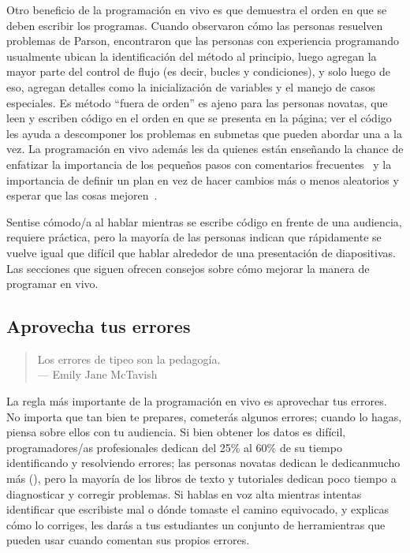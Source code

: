 Otro beneficio de la programación en vivo es que demuestra el orden en que se deben escribir los programas.
Cuando observaron cómo las personas resuelven problemas de Parson,
\cite{Ihan2011} encontraron que las personas con experiencia programando usualmente ubican la identificación del método al principio,
luego agregan la mayor parte del control de flujo (es decir, bucles y condiciones),
y solo luego de eso, agregan detalles como la inicialización de variables y el manejo de casos especiales.
Es método ``fuera de orden'' es ajeno para las personas novatas,
que leen y escriben código en el orden en que se presenta en la página;
ver el código les ayuda a descomponer los problemas en submetas que pueden abordar una a la vez.
La programación en vivo además les da quienes están enseñando la chance de enfatizar la importancia de los pequeños pasos con comentarios frecuentes~\cite{Blik2014}
y la importancia de definir un plan en vez de hacer 
cambios más o menos aleatorios y esperar que las cosas mejoren~\cite{Spoh1985}.

Sentise cómodo/a al hablar mientras se escribe código en 
frente de una audiencia, requiere práctica,
pero la mayoría de las personas indican que rápidamente se vuelve igual que difícil que hablar alrededor de una presentación de diapositivas.
Las secciones que siguen ofrecen consejos sobre cómo mejorar la manera de programar en vivo.

\subsection*{Aprovecha tus errores}

\begin{quote}

  Los errores de tipeo son la pedagogía. \\
  --- Emily Jane McTavish

\end{quote}

La regla más importante de la programación en vivo es aprovechar tus errores.
No importa que tan bien te prepares, 
cometerás algunos errores;
cuando lo hagas,
piensa sobre ellos con tu audiencia.
Si bien obtener los datos es difícil,
programadores/as profesionales dedican del 25\% al 60\% de su tiempo identificando y resolviendo errores;
las personas novatas dedican le dedicanmucho más (),
pero la mayoría de los libros de texto y tutoriales dedican poco tiempo a diagnosticar y corregir problemas.
Si hablas en voz alta mientras intentas identificar que escribiste mal
o dónde tomaste el camino equivocado,
y explicas cómo lo corriges,
les darás a tus estudiantes un conjunto de herramientras que pueden usar cuando comentan sus propios errores.

